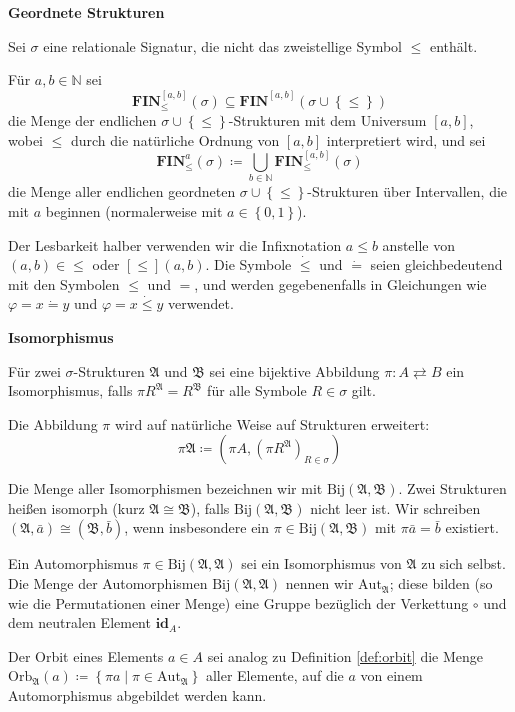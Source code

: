 \begin{defn}
\textbf{Geordnete Strukturen}

Sei $\sigma$ eine relationale Signatur, die nicht das zweistellige
Symbol $\leqslant$ enthält.

Für $a,b\in\mathbb{N}$ sei 
\[
\mathbf{FIN}_{\leqslant}^{\left[a,b\right]}\left(\sigma\right)\subseteq\mathbf{FIN}^{\left[a,b\right]}\left(\sigma\cup\left\{ \leqslant\right\} \right)
\]
 die Menge der endlichen $\sigma\cup\left\{ \leqslant\right\} $-Strukturen
mit dem Universum $\left[a,b\right]$, wobei $\leqslant$ durch die
natürliche Ordnung von $\left[a,b\right]$ interpretiert wird, und
sei 
\[
\mathbf{FIN}_{\leqslant}^{a}\left(\sigma\right)\coloneqq\bigcup_{b\in\mathbb{N}}\mathbf{FIN}_{\leqslant}^{\left[a,b\right]}\left(\sigma\right)
\]
 die Menge aller endlichen geordneten $\sigma\cup\left\{ \leqslant\right\} $-Strukturen
über Intervallen, die mit $a$ beginnen (normalerweise mit $a\in\left\{ 0,1\right\} $).
\end{defn}
Der Lesbarkeit halber verwenden wir die Infixnotation $a\leqslant b$
anstelle von $\left(a,b\right)\in\leqslant$ oder $\left[\leqslant\right]\left(a,b\right)$.
Die Symbole $\dot{\leqslant}$ und $\dot{=}$ seien gleichbedeutend
mit den Symbolen $\leqslant$ und $=$, und werden gegebenenfalls
in Gleichungen wie $\varphi=x\dot{=}y$ und $\varphi=x\dot{\leqslant}y$
verwendet.
\begin{defn}
\textbf{\label{def:isomorphism}Isomorphismus}

Für zwei $\sigma$-Strukturen $\mathfrak{A}$ und $\mathfrak{B}$
sei eine bijektive Abbildung $\pi:A\rightleftarrows B$ ein Isomorphismus,
falls $\pi R^{\mathfrak{A}}=R^{\mathfrak{B}}$ für alle Symbole $R\in\sigma$
gilt.

Die Abbildung $\pi$ wird auf natürliche Weise auf Strukturen erweitert:
\[
\pi\mathfrak{A}\coloneqq\left(\pi A,\left(\pi R^{\mathfrak{A}}\right)_{R\in\sigma}\right)
\]

Die Menge aller Isomorphismen bezeichnen wir mit $\mathrm{Bij}\left(\mathfrak{A},\mathfrak{B}\right)$.
Zwei Strukturen heißen isomorph (kurz $\mathfrak{A}\cong\mathfrak{B}$),
falls $\mathrm{Bij}\left(\mathfrak{A},\mathfrak{B}\right)$ nicht
leer ist. Wir schreiben $\left(\mathfrak{A},\bar{a}\right)\cong\left(\mathfrak{B},\bar{b}\right)$,
wenn insbesondere ein $\pi\in\mathrm{Bij}\left(\mathfrak{A},\mathfrak{B}\right)$
mit $\pi\bar{a}=\bar{b}$ existiert.

Ein Automorphismus $\pi\in\mathrm{Bij}\left(\mathfrak{A},\mathfrak{A}\right)$
sei ein Isomorphismus von $\mathfrak{A}$ zu sich selbst. Die Menge
der Automorphismen $\mathrm{Bij}\left(\mathfrak{A},\mathfrak{A}\right)$
nennen wir $\mathrm{Aut}_{\mathfrak{A}}$; diese bilden (so wie die
Permutationen einer Menge) eine Gruppe bezüglich der Verkettung $\circ$
und dem neutralen Element $\mathbf{id}_{A}$.

Der Orbit eines Elements $a\in A$ sei analog zu Definition \ref{def:orbit}
die Menge $\mathrm{Orb}_{\mathfrak{A}}\left(a\right)\coloneqq\left\{ \pi a\mid\pi\in\mathrm{Aut}_{\mathfrak{A}}\right\} $
aller Elemente, auf die $a$ von einem Automorphismus abgebildet werden
kann.
\end{defn}

